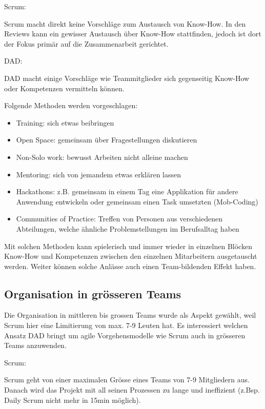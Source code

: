 {\Large Scrum:} \medskip

Scrum macht direkt keine Vorschläge zum Austausch von Know-How. In den Reviews kann ein gewisser Austausch über Know-How stattfinden, jedoch ist dort der Fokus primär auf die Zusammenarbeit gerichtet.

\bigskip 

{\Large DAD:} \cite{collabKHTransDad} \medskip

DAD macht einige Vorschläge wie Teammitglieder sich gegenseitig Know-How oder Kompetenzen vermitteln können. \medskip

Folgende Methoden werden vorgeschlagen:
\begin{itemize}
	\item Training: sich etwas beibringen
	\item Open Space: gemeinsam über Fragestellungen diskutieren
	\item Non-Solo work: bewusst Arbeiten nicht alleine machen
	\item Mentoring: sich von jemandem etwas erklären lassen
	\item Hackathons: z.B. gemeinsam in einem Tag eine Applikation für andere Anwendung entwickeln oder gemeinsam einen Task umsetzten (Mob-Coding)
	\item Communities of Practice: Treffen von Personen aus verschiedenen Abteilungen, welche ähnliche Problemstellungen im Berufsalltag haben
\end{itemize}

Mit solchen Methoden kann spielerisch und immer wieder in einzelnen Blöcken Know-How und Kompetenzen zwischen den einzelnen Mitarbeitern ausgetauscht werden. Weiter können solche Anlässe auch einen Team-bildenden Effekt haben.


\subsection{Organisation in grösseren Teams}

Die Organisation in mittleren bis grossen Teams wurde als Aspekt gewählt, weil Scrum hier eine Limitierung von max. 7-9 Leuten hat. Es interessiert welchen Ansatz DAD bringt um agile Vorgehensmodelle wie Scrum auch in grösseren Teams anzuwenden.

{\Large Scrum:} \cite{collabollabOrgLargerTeamsScrum} \medskip

Scrum geht von einer maximalen Grösse eines Teams von 7-9 Mitgliedern aus. Danach wird das Projekt mit all seinen Prozessen zu lange und ineffizient (z.Bsp. Daily Scrum nicht mehr in 15min möglich). \smallskip

